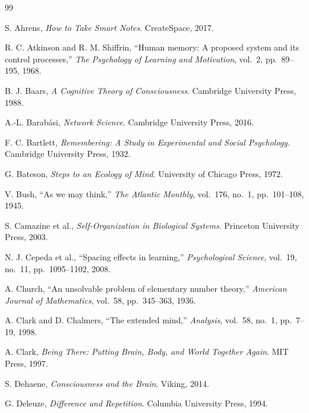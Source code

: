\documentclass[12pt,oneside]{book}
\theoremstyle{plain}
\theoremstyle{definition}
\theoremstyle{plain}
\begin{document}

\backmatter

\begin{thebibliography}{99}
\sloppy

S. Ahrens,
\textit{How to Take Smart Notes}.
CreateSpace, 2017.

R. C. Atkinson and R. M. Shiffrin,
``Human memory: A proposed system and its control processes,''
\textit{The Psychology of Learning and Motivation}, vol.~2, pp.~89--195, 1968.

B. J. Baars,
\textit{A Cognitive Theory of Consciousness}.
Cambridge University Press, 1988.

A.-L. Barab{\'a}si,
\textit{Network Science}.
Cambridge University Press, 2016.

F. C. Bartlett,
\textit{Remembering: A Study in Experimental and Social Psychology}.
Cambridge University Press, 1932.

G. Bateson,
\textit{Steps to an Ecology of Mind}.
University of Chicago Press, 1972.

V. Bush,
``As we may think,''
\textit{The Atlantic Monthly}, vol.~176, no.~1, pp.~101--108, 1945.

S. Camazine et al.,
\textit{Self-Organization in Biological Systems}.
Princeton University Press, 2003.

N. J. Cepeda et al.,
``Spacing effects in learning,''
\textit{Psychological Science}, vol.~19, no.~11, pp.~1095--1102, 2008.

A. Church,
``An unsolvable problem of elementary number theory,''
\textit{American Journal of Mathematics}, vol.~58, pp.~345--363, 1936.

A. Clark and D. Chalmers,
``The extended mind,''
\textit{Analysis}, vol.~58, no.~1, pp.~7--19, 1998.

A. Clark,
\textit{Being There: Putting Brain, Body, and World Together Again}.
MIT Press, 1997.

S. Dehaene,
\textit{Consciousness and the Brain}.
Viking, 2014.

G. Deleuze,
\textit{Difference and Repetition}.
Columbia University Press, 1994.


\end{thebibliography}
\end{document}
